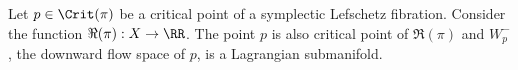 

    Let $p\in \Crit(\pi)$ be a critical point of a symplectic Lefschetz fibration. 
    Consider the function $\Re(\pi):X\to \RR$. 
    The point $p$ is also critical point of $\Re(\pi)$ and 
     $W^-_p$, the downward flow space of $p$, is a Lagrangian submanifold.  

